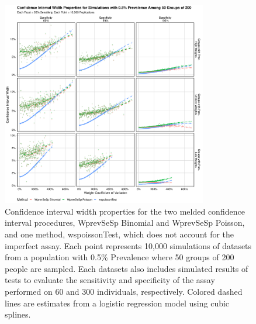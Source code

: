 \documentclass[AMA,STIX1COL]{WileyNJD-v2}
\begin{document}
\begin{figure}
\centering
\includegraphics[width=0.8\textwidth]{figures/imperfect_confidence_interval_width_50_groups_0_005_prev}
\caption{Confidence interval width properties for the two melded confidence interval procedures, WprevSeSp Binomial and WprevSeSp Poisson, and one method, wspoissonTest, which does not account for the imperfect assay.
Each point represents 10,000 simulations of datasets from a population with 0.5\% Prevalence where 50 groups of 200 people are sampled.
Each datasets also includes simulated results of tests to evaluate the sensitivity and specificity of the assay performed on 60 and 300 individuals, respectively.
Colored dashed lines are estimates from a logistic regression model using cubic splines.}
\label{fig:imperfect_confidence_interval_width_50_groups_0_005_prev}
\end{figure}
\end{document}
